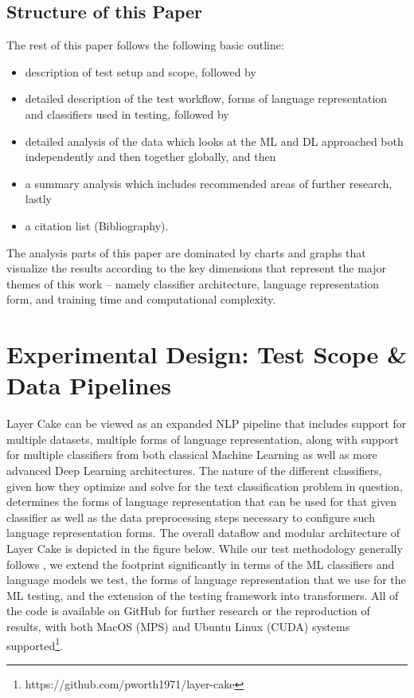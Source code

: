 \documentclass[final]{clv2025}
\begin{document}
\subsection{Structure of this Paper}
The rest of this paper follows the following basic outline:
\begin{itemize}
    \item description of test setup and scope, followed by
    \item detailed description of the test workflow, forms of language representation and classifiers used in testing, followed by
    \item detailed analysis of the data which looks at the ML and DL approached both independently and then together globally, and then
    \item a summary analysis which includes recommended areas of further research, lastly
    \item a citation list (Bibliography).
\end{itemize}

The analysis parts of this paper are dominated by charts and graphs that visualize the results according to the key dimensions that represent the major themes of this work – namely classifier architecture, language representation form, and training time and computational complexity.

\section{Experimental Design: Test Scope \& Data Pipelines}
Layer Cake can be viewed as an expanded NLP pipeline that includes support for multiple datasets, multiple forms of language representation, along with support for multiple classifiers from both classical Machine Learning as well as more advanced Deep Learning architectures. The nature of the different classifiers, given how they optimize and solve for the text classification problem in question, determines the forms of language representation that can be used for that given classifier as well as the data preprocessing steps necessary to configure such language representation forms. The overall dataflow and modular architecture of Layer Cake is depicted in the figure below. While our test methodology generally follows \cite{moreo}, we extend the footprint significantly in terms of the ML classifiers and language models we test, the forms of language representation that we use for the ML testing, and the extension of the testing framework into transformers. All of the code is available on GitHub for further research or the reproduction of results, with both MacOS (MPS) and Ubuntu Linux (CUDA) systems supported\footnote{  https://github.com/pworth1971/layer-cake}. 
\end{document}
